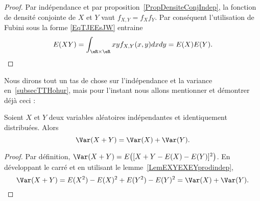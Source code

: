 \begin{proof}
    Par indépendance et par proposition~\ref{PropDensiteConjIndep}, la fonction de densité conjointe de \( X\) et \( Y\) vaut \( f_{X,Y}=f_Xf_Y\). Par conséquent l'utilisation de Fubini sous la forme \eqref{EqTJEEsJW} entraine
    \begin{equation}
        E(XY)=\int_{\eR\times\eR}xyf_{X,Y}(x,y)dxdy=E(X)E(Y).
    \end{equation}
\end{proof}

Nous dirons tout un tas de chose sur l'indépendance et la variance en~\ref{subsecTTHohur}, mais pour l'instant nous allons mentionner et démontrer déjà ceci :
\begin{lemma}   \label{LemVarXpYsmindep}
    Soient \( X\) et \( Y\) deux variables aléatoires indépendantes et identiquement distribuées. Alors
    \begin{equation}
        \Var(X+Y)=\Var(X)+\Var(Y).
    \end{equation}
\end{lemma}

\begin{proof}
    Par définition, \( \Var(X+Y)=E\big( [X+Y-E(X)-E(Y)]^2 \big)\). En développant le carré et en utilisant le lemme~\ref{LemEXYEXEYprodindep},
    \begin{equation}
        \Var(X+Y)=E(X^2)-E(X)^2+E(Y^2)-E(Y)^2=\Var(X)+\Var(Y).
    \end{equation}
\end{proof}


